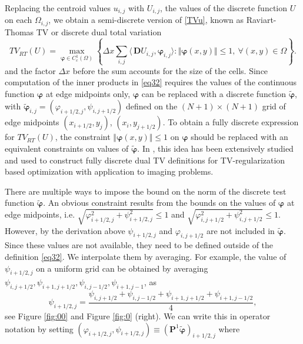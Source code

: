 \documentclass[reqno,a4paper,12pt]{amsart}
\begin{document}
Replacing the centroid values $u_{i,j}$ with $U_{i,j}$, the values of the discrete function $U$  on each $\Omega_{i,j}$, we obtain a semi-discrete version of \eqref{TVu}, known as Raviart-Thomas TV \cite{ChambolleBook} or discrete dual total variation
\begin{equation}
    TV_{RT}(U) = \max_{\bm{\varphi} \in C_c^{1}(\Omega)} \left\{ \Delta x \sum_{i,j} \langle\, \bm{D}U_{i,j}, \bm{\varphi}_{i,j} \rangle : \Vert \bm{\varphi} (x,y) \Vert \leq 1, ~ \forall (x,y) \in \Omega  \right\}.
    \label{eq32}
\end{equation}
and the factor $\Delta x$ before the sum accounts for
the size of the cells. Since computation of the inner products in \eqref{eq32} requires the values of the continuous function $\bm{\varphi}$  at edge midpoints only, $\bm{\varphi}$ can be replaced with a discrete function $\widetilde{\bm{\varphi}}$, with $\widetilde{\bm{\varphi}}_{i,j} = (\varphi_{i+1/2,j},\psi_{i,j+1/2})$  defined on the $(N+1) \times (N+1)$ grid of edge midpoints $(x_{i+1/2},y_j)$, $(x_i,y_{j+1/2})$.
To obtain a fully discrete expression for $TV_{RT}(U)$, the constraint $\Vert \bm{\varphi} (x,y) \Vert \leq 1$ on $ \bm{\varphi}$ should  be replaced with an equivalent constraints on values of $\widetilde{\bm{\varphi}}$.  In \cite{ChambollePock, Condat, Hintermuller}, this idea has been extensively studied and used to construct fully discrete dual TV definitions for TV-regularization based optimization with application to imaging problems. 

There are multiple ways to impose the bound on the norm of the discrete test function  ${\widetilde{\bm{\varphi}}}$. An obvious constraint results from the bounds on the values of $\bm\varphi$ at edge midpoints, i.e. $\sqrt{\varphi_{i+1/2,j}^2 + \psi_{i+1/2,j}^2} \leq 1$ and $\sqrt{\varphi_{i,j+1/2}^2 + \psi_{i,j+1/2}^2} \leq 1$. However, by the derivation above $\psi_{i+1/2,j}$ and $\varphi_{i,j+1/2}$ are not included in $\widetilde{\bm{\varphi}}$. Since these values are not available, they need to be defined outside of the definition \eqref{eq32}. We interpolate them by averaging. For example, the value of $\psi_{i+1/2,j}$  on a uniform grid can be obtained by averaging $\psi_{i,j+1/2},\psi_{i+1,j+1/2},\psi_{i,j-1/2},\psi_{i+1,j-1}$, as $$\psi_{i+1/2,j} =  \frac{\psi_{i,j+1/2}+\psi_{i,j-1/2}+\psi_{i+1,j+1/2}+\psi_{i+1,j-1/2}}{4},$$ see Figure \ref{fig:00} and Figure \ref{fig:0} (right). We can write this in operator notation by setting $(\varphi_{i+1/2,j},  \psi_{i+1/2,j})\equiv(\bm{P}^1 \widetilde{\bm{\varphi}})_{i+1/2,j}$ where
\end{document}
